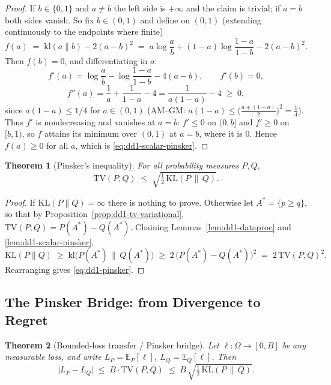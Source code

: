 \documentclass[11pt,a4paper]{article}
\theoremstyle{definition}
\theoremstyle{plain}
\newtheorem{theorem}{Theorem}[section]
\newcommand{\E}{\mathbb{E}}
\newcommand{\KL}{\mathrm{KL}}
\newcommand{\TV}{\mathrm{TV}}
\begin{document}
\begin{proof}
If $b \in \{0, 1\}$ and $a \neq b$ the left side is $+\infty$ and the claim
is trivial; if $a = b$ both sides vanish. So fix $b \in (0,1)$ and define on
$(0,1)$ (extending continuously to the endpoints where finite)
\[
f(a) \;=\; \mathrm{kl}(a \| b) - 2 (a - b)^2
\;=\; a \log\frac{a}{b} + (1 - a)\log\frac{1-a}{1-b} - 2(a-b)^2 .
\]
Then $f(b) = 0$, and differentiating in $a$:
\[
f'(a) = \log \frac{a}{b} - \log \frac{1-a}{1-b} - 4(a - b),
\qquad f'(b) = 0,
\]
\[
f''(a) = \frac{1}{a} + \frac{1}{1 - a} - 4 = \frac{1}{a(1-a)} - 4 \;\ge\; 0,
\]
since $a(1-a) \le 1/4$ for $a \in (0,1)$ (AM--GM: $a(1-a) \le
\bigl(\frac{a + (1-a)}{2}\bigr)^2 = \frac14$). Thus $f'$ is nondecreasing
and vanishes at $a = b$: $f' \le 0$ on $(0, b]$ and $f' \ge 0$ on $[b, 1)$,
so $f$ attains its minimum over $(0,1)$ at $a = b$, where it is $0$. Hence
$f(a) \ge 0$ for all $a$, which is \eqref{eq:dd1-scalar-pinsker}.
\end{proof}

\begin{theorem}[Pinsker's inequality]
\label{thm:dd1-pinsker}
For all probability measures $P, Q$,
\begin{equation}
\label{eq:dd1-pinsker}
\TV(P, Q) \;\le\; \sqrt{ \tfrac{1}{2}\, \KL(P \,\|\, Q) } .
\end{equation}
\end{theorem}

\begin{proof}
If $\KL(P\|Q) = \infty$ there is nothing to prove. Otherwise let
$A^* = \{p \ge q\}$, so that by
Proposition~\ref{prop:dd1-tv-variational}, $\TV(P, Q) = P(A^*) - Q(A^*)$.
Chaining Lemmas~\ref{lem:dd1-dataproc} and \ref{lem:dd1-scalar-pinsker},
\[
\KL(P \| Q)
\;\ge\; \mathrm{kl}\bigl(P(A^*) \,\|\, Q(A^*)\bigr)
\;\ge\; 2\,\bigl(P(A^*) - Q(A^*)\bigr)^2
\;=\; 2\, \TV(P, Q)^2 .
\]
Rearranging gives \eqref{eq:dd1-pinsker}.
\end{proof}

\subsection{The Pinsker Bridge: from Divergence to Regret}

\begin{theorem}[Bounded-loss transfer / Pinsker bridge]
\label{thm:dd1-bridge}
Let $\ell : \Omega \to [0, B]$ be any measurable loss, and write
$L_P = \E_P[\ell]$, $L_Q = \E_Q[\ell]$. Then
\begin{equation}
\label{eq:dd1-bridge}
\bigl| L_P - L_Q \bigr|
\;\le\; B \cdot \TV(P, Q)
\;\le\; B \, \sqrt{ \tfrac{1}{2} \,\KL(P \,\|\, Q) } .
\end{equation}
\end{theorem}
\end{document}

